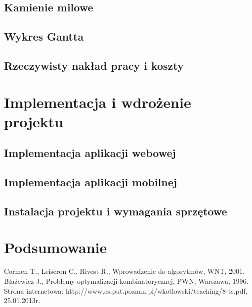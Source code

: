 \documentclass[a4paper,11pt]{article}
\begin{document}
\subsection{Kamienie milowe}
\subsection{Wykres Gantta}
\subsection{Rzeczywisty nakład pracy i koszty} 
\section{Implementacja i wdrożenie projektu}
\subsection{Implementacja aplikacji webowej}
\subsection{Implementacja aplikacji mobilnej}
\subsection{Instalacja projektu i wymagania sprzętowe}
\section{Podsumowanie}

\newpage
\listoffigures
{} 
\newpage
\listoftables
{}
\newpage
\lstlistoflistings
{}


\newpage
{}
\begin{thebibliography}{9}
 Cormen T., Leiseron C., Rivest R., Wprowadzenie do algorytmów, WNT, 2001. 
 Błażewicz J., Problemy optymalizacji kombinatorycznej, PWN, Warszawa, 1996.
 Strona internetowa: http://www.cs.put.poznan.pl/wkotlowski/teaching/8-ts.pdf, 25.01.2013r.
\end{thebibliography}
\end{document}
